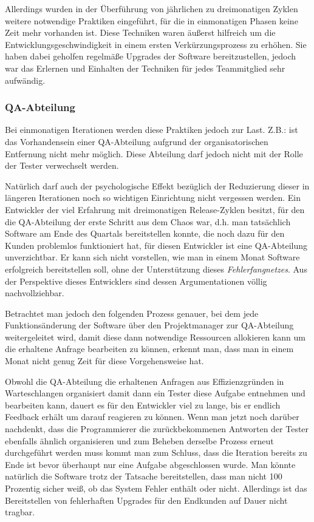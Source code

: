 Allerdings wurden in der Überführung von jährlichen zu dreimonatigen Zyklen
weitere notwendige Praktiken eingeführt, für die in einmonatigen Phasen keine
Zeit mehr vorhanden ist. Diese Techniken waren äußerst hilfreich um die
Entwicklungsgeschwindigkeit in einem ersten Verkürzungsprozess zu erhöhen. Sie
haben dabei geholfen regelmäße Upgrades der Software bereitzustellen, jedoch
war das Erlernen und Einhalten der Techniken für jedes Teammitglied sehr
aufwändig.

\subsubsection{QA-Abteilung}
\label{minisec:qa-abteilung}

Bei einmonatigen Iterationen werden diese Praktiken jedoch zur Last. Z.B.: ist
das Vorhandensein einer QA-Abteilung aufgrund der organisatorischen Entfernung
nicht mehr möglich. Diese Abteilung darf jedoch nicht mit der Rolle der Tester
verwechselt werden.

Natürlich darf auch der psychologische Effekt bezüglich der Reduzierung
dieser in längeren Iterationen noch so wichtigen Einrichtung nicht vergessen
werden.  Ein Entwickler der viel Erfahrung mit dreimonatigen Release-Zyklen
besitzt, für den die QA-Abteilung der erste Schritt aus dem Chaos war, d.h.
man tatsächlich Software am Ende des Quartals bereitstellen konnte, die noch
dazu für den Kunden problemlos funktioniert hat, für diesen Entwickler ist
eine QA-Abteilung unverzichtbar. Er kann sich nicht vorstellen, wie man in
einem Monat Software erfolgreich bereitstellen soll, ohne der Unterstützung
dieses \emph{Fehlerfangnetzes}. Aus der Perspektive dieses Entwicklers sind
dessen Argumentationen völlig nachvollziehbar.

Betrachtet man jedoch den folgenden Prozess genauer, bei dem jede
Funktionsänderung der Software über den Projektmanager zur QA-Abteilung
weitergeleitet wird, damit diese dann notwendige Ressourcen allokieren kann um
die erhaltene Anfrage bearbeiten zu können, erkennt man, dass man in einem
Monat nicht genug Zeit für diese Vorgehensweise hat.

Obwohl die QA-Abteilung die erhaltenen Anfragen aus Effizienzgründen in
Warteschlangen organisiert damit dann ein Tester diese Aufgabe entnehmen und
bearbeiten kann, dauert es für den Entwickler viel zu lange, bis er endlich
Feedback erhält um darauf reagieren zu können. Wenn man jetzt noch darüber
nachdenkt, dass die Programmierer die zurückbekommenen Antworten der Tester
ebenfalls ähnlich organisieren und zum Beheben derselbe Prozess erneut
durchgeführt werden muss kommt man zum Schluss, dass die Iteration bereits zu
Ende ist bevor überhaupt nur eine Aufgabe abgeschlossen wurde. Man könnte
natürlich die Software trotz der Tatsache bereitstellen, dass man nicht 100
Prozentig sicher weiß, ob das System Fehler enthält oder nicht. Allerdings ist
das Bereitstellen von fehlerhaften Upgrades für den Endkunden auf Dauer nicht
tragbar.


